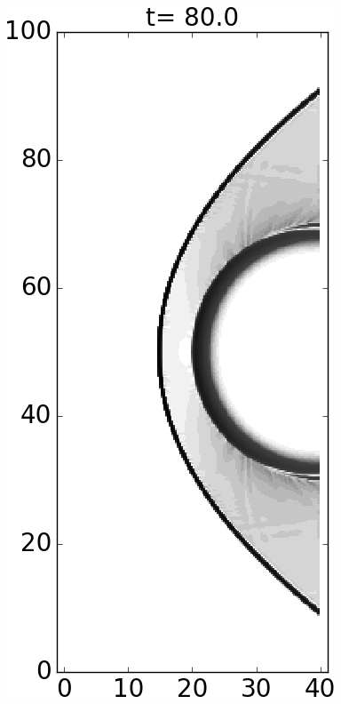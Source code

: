 \documentclass[preprint, 11pt]{article}
\begin{document}
\begin{figure}[!h]
{    \includegraphics[scale=0.3]{figures/cylinder_HLLEMCC.png}
    \qquad \qquad \qquad
}
\end{figure}
\end{document}
